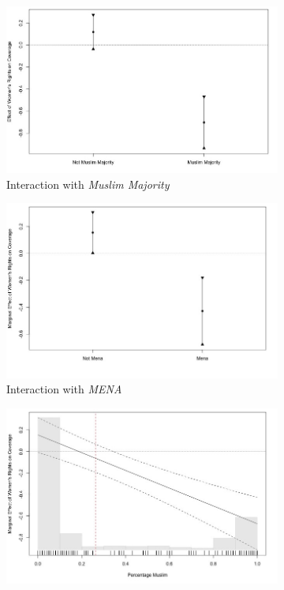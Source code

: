 \documentclass[11pt, oneside]{article}
\begin{document}
\begin{figure}
\begin{subfigure}{.5\textwidth}
  \centering
  \includegraphics[width=1\linewidth]{nb1}
  \caption{Interaction with \emph{Muslim Majority}}
  \label{fig:sfig1}
\end{subfigure} 
\begin{subfigure}{.5\textwidth}
  \centering
  \includegraphics[width=1\linewidth]{nb2}
    \caption{Interaction with \emph{MENA}}
  \label{fig:sfig2}
\end{subfigure}
\begin{subfigure}{.5\textwidth}
\vspace{.5cm}
  \centering
  \includegraphics[width=1\linewidth]{nb3}

\end{subfigure}
\end{figure}
\end{document}

